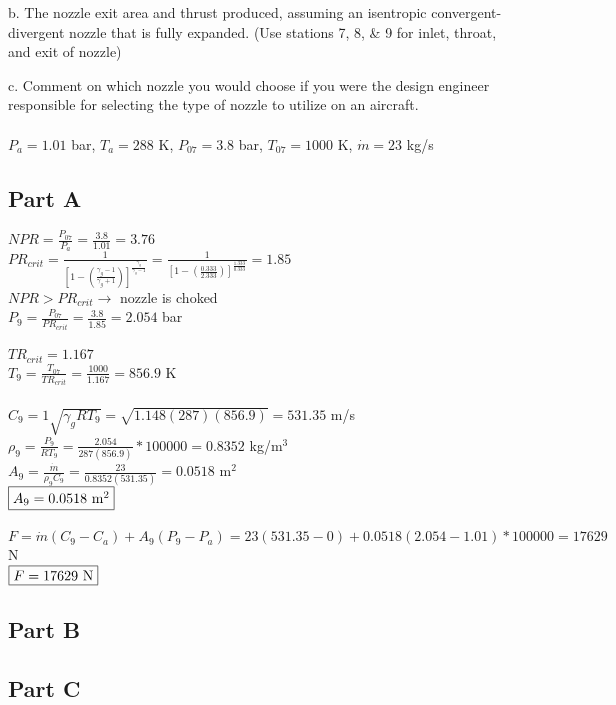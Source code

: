 \documentclass{article}
\begin{document}
b. The nozzle exit area and thrust produced, assuming an isentropic convergent-
divergent nozzle that is fully expanded. (Use stations 7, 8, \& 9 for inlet, throat, and
exit of nozzle)

c. Comment on which nozzle you would choose if you were the design engineer
responsible for selecting the type of nozzle to utilize on an aircraft. \\\\
$P_a=1.01$ bar, $T_a=288$ K, $P_{07}=3.8$ bar, $T_{07}=1000$ K, $\dot{m}=23$ kg/s

\subsection*{Part A}
$NPR=\frac{P_{07}}{P_a}=\frac{3.8}{1.01}=3.76$ \\
$PR_{crit}=\frac{1}{[1-(\frac{\gamma_g-1}{\gamma_g+1})]
^\frac{\gamma_g}{\gamma_g-1}}=\frac{1}{[1-(\frac{0.333}{2.333})]
^\frac{1.333}{0.333}}=1.85$ \\
$NPR>PR_{crit} \rightarrow$ nozzle is choked \\
$P_9=\frac{P_{07}}{PR_{crit}}=\frac{3.8}{1.85}=2.054$ bar \\\\
$TR_{crit}=1.167$ \\
$T_9=\frac{T_{07}}{TR_{crit}}=\frac{1000}{1.167}=856.9$ K \\\\
$C_9=1\sqrt{\gamma_gRT_9}=\sqrt{1.148(287)(856.9)}=531.35$ m/s \\
$\rho_9=\frac{P_9}{RT_9}=\frac{2.054}{287(856.9)}*100000=0.8352$ kg/m$^3$ \\
$A_9=\frac{\dot{m}}{\rho_9C_9}=\frac{23}{0.8352(531.35)}=0.0518$ m$^2$ \\
$\fbox{$A_9=0.0518$ m$^2$}$ \\\\
$F=\dot{m}(C_9-C_a)+A_9(P_9-P_a)=23(531.35-0)+0.0518(2.054-1.01)*100000=17629$ N \\
$\fbox{$F=17629$ N}$

\subsection*{Part B}

\subsection*{Part C}
\end{document}
